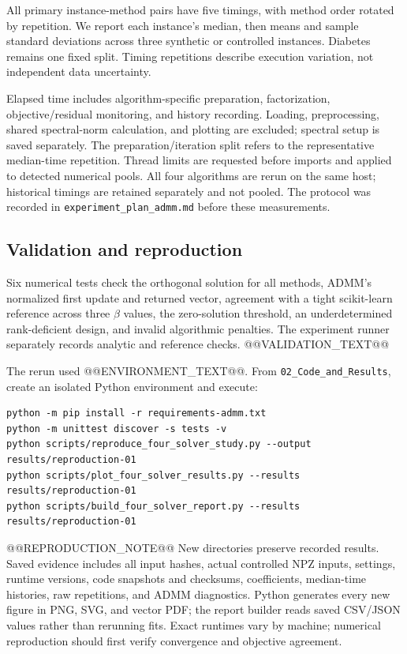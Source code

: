 \documentclass[10pt,letterpaper]{article}
\begin{document}
All primary instance-method pairs have five timings, with method order rotated by repetition. We report each instance's median, then means and sample standard deviations across three synthetic or controlled instances. Diabetes remains one fixed split. Timing repetitions describe execution variation, not independent data uncertainty.

Elapsed time includes algorithm-specific preparation, factorization, objective/residual monitoring, and history recording. Loading, preprocessing, shared spectral-norm calculation, and plotting are excluded; spectral setup is saved separately. The preparation/iteration split refers to the representative median-time repetition. Thread limits are requested before imports and applied to detected numerical pools. All four algorithms are rerun on the same host; historical timings are retained separately and not pooled. The protocol was recorded in \texttt{experiment\_plan\_admm.md} before these measurements.

\subsection{Validation and reproduction}\label{sec:reproducibility}
Six numerical tests check the orthogonal solution for all methods, ADMM's normalized first update and returned vector, agreement with a tight scikit-learn reference across three $\beta$ values, the zero-solution threshold, an underdetermined rank-deficient design, and invalid algorithmic penalties. The experiment runner separately records analytic and reference checks. @@VALIDATION_TEXT@@

The rerun used @@ENVIRONMENT_TEXT@@. From \texttt{02\_Code\_and\_Results}, create an isolated Python environment and execute:
{\small
\begin{verbatim}
python -m pip install -r requirements-admm.txt
python -m unittest discover -s tests -v
python scripts/reproduce_four_solver_study.py --output results/reproduction-01
python scripts/plot_four_solver_results.py --results results/reproduction-01
python scripts/build_four_solver_report.py --results results/reproduction-01
\end{verbatim}
}
@@REPRODUCTION_NOTE@@
New directories preserve recorded results. Saved evidence includes all input hashes, actual controlled NPZ inputs, settings, runtime versions, code snapshots and checksums, coefficients, median-time histories, raw repetitions, and ADMM diagnostics. Python generates every new figure in PNG, SVG, and vector PDF; the report builder reads saved CSV/JSON values rather than rerunning fits. Exact runtimes vary by machine; numerical reproduction should first verify convergence and objective agreement.
\end{document}
